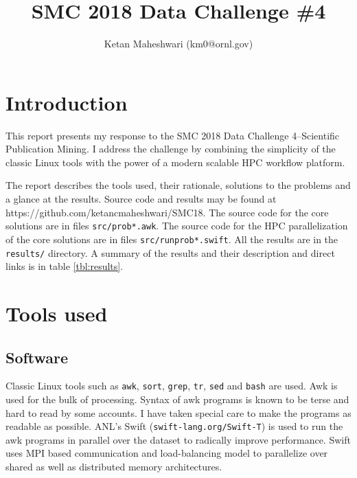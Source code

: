 \documentclass{article}
\title{SMC 2018 Data Challenge \#4}
\author{Ketan Maheshwari (km0@ornl.gov)}
\begin{document}
\maketitle
\section*{Introduction}

This report presents my response to the SMC 2018 Data Challenge 4--Scientific
Publication Mining. I address the challenge by combining the simplicity of the
classic Linux tools with the power of a modern scalable HPC workflow
platform.

The report describes the tools used, their rationale, solutions to the problems
and a glance at the results. Source code and results may be found
at https://github.com/ketancmaheshwari/SMC18. The source code for the core
solutions are in files \texttt{src/prob*.awk}. The source code for the HPC
parallelization of the core solutions are in files \texttt{src/runprob*.swift}.
All the results are in the \texttt{results/} directory. A summary of the results and their description and direct links is in table \ref{tbl:results}.

\section*{Tools used}
\subsection*{Software}
Classic Linux tools such as \texttt{awk}, \texttt{sort}, \texttt{grep},
\texttt{tr}, \texttt{sed} and \texttt{bash} are used. Awk is used for the bulk
of processing.  Syntax of awk programs is known to be terse and hard to read by
some accounts. I have taken special care to make the programs as readable as
possible. ANL's Swift (\texttt{swift-lang.org/Swift-T}) is used to run the awk
programs in parallel over the dataset to radically improve performance.  Swift
uses MPI based communication and load-balancing model to parallelize over
shared as well as distributed memory architectures.
\end{document}
